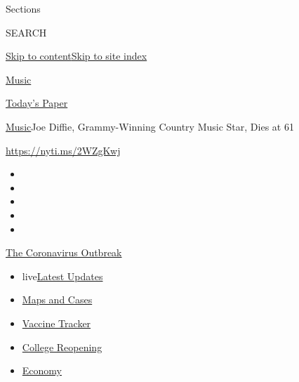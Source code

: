 Sections

SEARCH

\protect\hyperlink{site-content}{Skip to
content}\protect\hyperlink{site-index}{Skip to site index}

\href{https://www.nytimes.com/section/arts/music}{Music}

\href{https://myaccount.nytimes.com/auth/login?response_type=cookie\&client_id=vi}{}

\href{https://www.nytimes.com/section/todayspaper}{Today's Paper}

\href{/section/arts/music}{Music}\textbar{}Joe Diffie, Grammy-Winning
Country Music Star, Dies at 61

\url{https://nyti.ms/2WZgKwj}

\begin{itemize}
\item
\item
\item
\item
\item
\end{itemize}

\href{https://www.nytimes.com/news-event/coronavirus?action=click\&pgtype=Article\&state=default\&region=TOP_BANNER\&context=storylines_menu}{The
Coronavirus Outbreak}

\begin{itemize}
\tightlist
\item
  live\href{https://www.nytimes.com/2020/08/03/world/coronavirus-covid-19.html?action=click\&pgtype=Article\&state=default\&region=TOP_BANNER\&context=storylines_menu}{Latest
  Updates}
\item
  \href{https://www.nytimes.com/interactive/2020/us/coronavirus-us-cases.html?action=click\&pgtype=Article\&state=default\&region=TOP_BANNER\&context=storylines_menu}{Maps
  and Cases}
\item
  \href{https://www.nytimes.com/interactive/2020/science/coronavirus-vaccine-tracker.html?action=click\&pgtype=Article\&state=default\&region=TOP_BANNER\&context=storylines_menu}{Vaccine
  Tracker}
\item
  \href{https://www.nytimes.com/2020/08/02/us/covid-college-reopening.html?action=click\&pgtype=Article\&state=default\&region=TOP_BANNER\&context=storylines_menu}{College
  Reopening}
\item
  \href{https://www.nytimes.com/live/2020/08/03/business/stock-market-today-coronavirus?action=click\&pgtype=Article\&state=default\&region=TOP_BANNER\&context=storylines_menu}{Economy}
\end{itemize}

